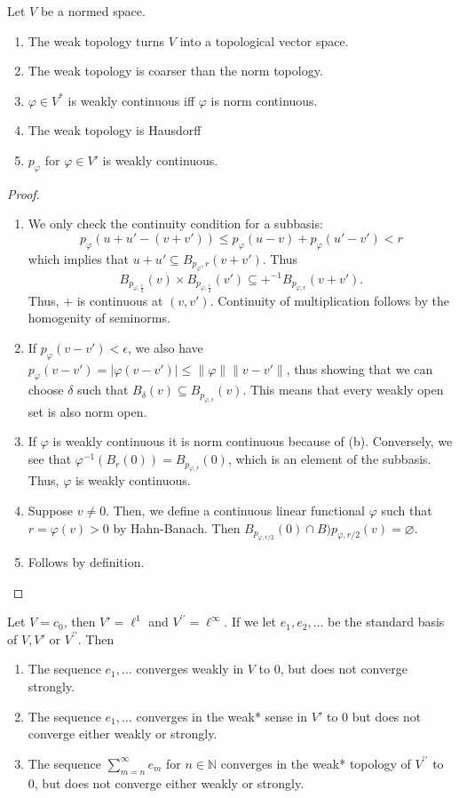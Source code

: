 \documentclass[twoside,symmetric, openany, 12pt]{./tuftebook}
\theoremstyle{definition}
\theoremstyle{definition}
\theoremstyle{definition}
\newenvironment{parts}{\begin{enumerate}[label=(\alph*)]}{\end{enumerate}}
\newcommand{\N}{\mathbb{N}}
\begin{document}
\begin{Theorem}
	Let $V$ be a normed space.
	\begin{parts}
		\item The weak topology turns $V$ into a topological vector space.
		\item The weak topology is coarser than the norm topology.
		\item $\varphi\in V^*$ is weakly continuous iff $\varphi$ is norm continuous.
		\item The weak topology is Hausdorff
		\item $p_\varphi$ for $\varphi\in V'$ is weakly continuous.
	\end{parts}
\end{Theorem}
\begin{proof}
	\begin{parts}
		\item We only check the continuity condition for a subbasis:
		\[
		p_\varphi(u+u'-(v+v'))\le p_\varphi(u-v)+p_\varphi(u'-v')< r
		\]
		which implies that $u+u'\subseteq B_{p_{\varphi}, r}(v+v')$. Thus
		\[
		B_{p_{\varphi, \frac{r}{2}}}(v)\times B_{p_{\varphi, \frac{r}{2}}}(v')\subseteq +^{-1}B_{p_{\varphi, r}}(v+v')
		.\] 
		Thus, $+$ is continuous at $(v, v')$. Continuity of multiplication follows by the homogenity of seminorms.
		\item If $p_\varphi(v-v')<\epsilon$, we also have $p_\varphi(v-v')=|\varphi(v-v')| \le \| \varphi\| \|v-v'\|$, thus showing that we can choose $\delta$ such that $B_\delta(v)\subseteq B_{p_{\varphi, \epsilon}}(v)$. This means that every weakly open set is also norm open.
		\item If  $\varphi$ is weakly continuous it is norm continuous because of (b). Conversely, we see that $\varphi^{-1}(B_r(0))=B_{p_{\varphi,r}}(0)$, which is an element of the subbasis. Thus, $\varphi$ is weakly continuous.
		\item Suppose $v\neq 0$. Then, we define a continuous linear functional $\varphi$ such that $r=\varphi(v)>0$ by Hahn-Banach. Then $B_{p_{\varphi, r / 2}}(0)\cap B){p_{\varphi, r / 2}}(v )=\varnothing$.
		\item Follows by definition.\qedhere
	\end{parts}
\end{proof}
\begin{Example}
	Let $V=c_0$, then $V'=\ell^1$ and $V^{\prime\prime}=\ell^\infty$. If we let $e_1, e_2, \dots$ be the standard basis of $V, V'$ or $V^{\prime\prime}$. Then
	\begin{parts}
		\item The sequence $e_1, \dots$ converges weakly in $V$ to $0$, but does not converge strongly.
		\item The sequence $e_1, \dots$ converges in the weak* sense in $V'$ to 0 but does not converge either weakly or strongly.
		\item The sequence $\sum_{m=n}^\infty e_m$ for $n\in \N$ converges in the weak* topology of $V^{\prime\prime}$ to 0, but does not converge either weakly or strongly.
	\end{parts}
\end{Example}
\end{document}
